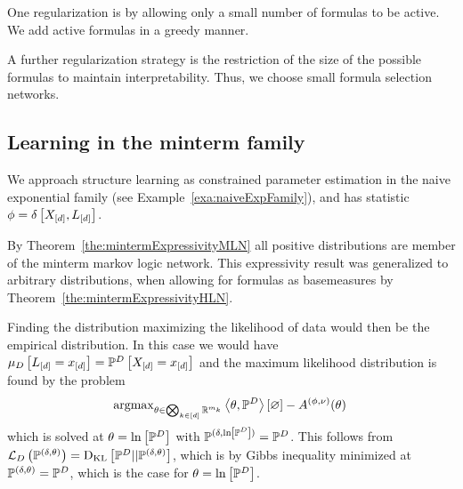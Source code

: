 One regularization is by allowing only a small number of formulas to be active.
We add active formulas in a greedy manner.

A further regularization strategy is the restriction of the size of the possible formulas to maintain interpretability. 
Thus, we choose small formula selection networks.





\subsection{Learning in the minterm family}

We approach structure learning as constrained parameter estimation in the naive exponential family (see Example~\ref{exa:naiveExpFamily}),  
and has statistic $\phi = \delta\left[X_{[d]}, L_{[d]}\right]$.

By Theorem~\ref{the:mintermExpressivityMLN} all positive distributions are member of the minterm markov logic network.
This expressivity result was generalized to arbitrary distributions, when allowing for formulas as basemeasures by Theorem~\ref{the:mintermExpressivityHLN}.

Finding the distribution maximizing the likelihood of data would then be the empirical distribution.
In this case we would have $\mu_{D}\left[L_{[d]}=x_{[d]}\right] = \mathbb{P}^{D}\left[X_{[d]}=x_{[d]}\right]$ and the maximum likelihood distribution is found by the problem
\begin{align*}
	\mathrm{argmax}_{\theta\in\bigotimes_{k\in[d]} \mathbb{R}^{m_{k}}}  \left\langle \theta,\mathbb{P}^{D}\right\rangle \left[ \varnothing \right] - A^{(\phi,\nu)}(\theta) \, 
\end{align*}
which is solved at $\theta=\ln \left[ \mathbb{P}^{D} \right]$ with $\mathbb{P}^{(\delta,\ln \left[ \mathbb{P}^{D} \right])}= \mathbb{P}^{D}$.
This follows from $\mathcal{L}_{D}\left(\mathbb{P}^{(\delta,\theta)}\right)=\mathrm{D}_{\mathrm{KL}}\left[ \mathbb{P}^{D} || \mathbb{P}^{(\delta,\theta)} \right]$, which is by Gibbs inequality minimized at $\mathbb{P}^{(\delta,\theta)}=\mathbb{P}^{D}$, which is the case for $\theta = \ln \left[ \mathbb{P}^{D} \right]$.

